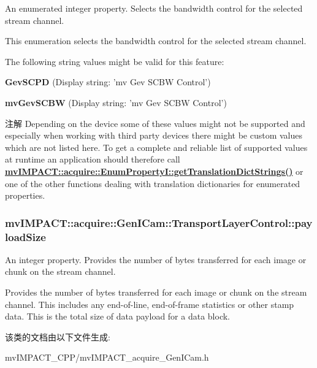 An enumerated integer property. Selects the bandwidth control for the selected stream channel. 

This enumeration selects the bandwidth control for the selected stream channel.

The following string values might be valid for this feature\+:
\begin{DoxyItemize}
\item {\bfseries Gev\+S\+C\+P\+D} (Display string\+: 'mv Gev S\+C\+B\+W Control')
\item {\bfseries mv\+Gev\+S\+C\+B\+W} (Display string\+: 'mv Gev S\+C\+B\+W Control')
\end{DoxyItemize}

\begin{DoxyNote}{注解}
Depending on the device some of these values might not be supported and especially when working with third party devices there might be custom values which are not listed here. To get a complete and reliable list of supported values at runtime an application should therefore call {\bfseries \hyperlink{classmv_i_m_p_a_c_t_1_1acquire_1_1_enum_property_i_a0ba6ccbf5ee69784d5d0b537924d26b6}{mv\+I\+M\+P\+A\+C\+T\+::acquire\+::\+Enum\+Property\+I\+::get\+Translation\+Dict\+Strings()}} or one of the other functions dealing with translation dictionaries for enumerated properties. 
\end{DoxyNote}
\hypertarget{classmv_i_m_p_a_c_t_1_1acquire_1_1_gen_i_cam_1_1_transport_layer_control_a60fb7c69b1fa34dabb0e1159759fca4a}{
\subsubsection[{payload\+Size}]{ mv\+I\+M\+P\+A\+C\+T\+::acquire\+::\+Gen\+I\+Cam\+::\+Transport\+Layer\+Control\+::payload\+Size}}\label{classmv_i_m_p_a_c_t_1_1acquire_1_1_gen_i_cam_1_1_transport_layer_control_a60fb7c69b1fa34dabb0e1159759fca4a}


An integer property. Provides the number of bytes transferred for each image or chunk on the stream channel. 

Provides the number of bytes transferred for each image or chunk on the stream channel. This includes any end-\/of-\/line, end-\/of-\/frame statistics or other stamp data. This is the total size of data payload for a data block. 

该类的文档由以下文件生成\+:\begin{DoxyCompactItemize}
\item 
mv\+I\+M\+P\+A\+C\+T\+\_\+\+C\+P\+P/mv\+I\+M\+P\+A\+C\+T\+\_\+acquire\+\_\+\+Gen\+I\+Cam.\+h\end{DoxyCompactItemize}
